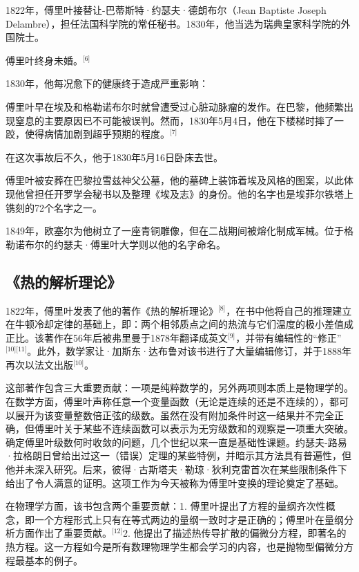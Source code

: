 1822年，傅里叶接替让-巴蒂斯特·约瑟夫·德朗布尔（Jean Baptiste Joseph Delambre），担任法国科学院的常任秘书。1830年，他当选为瑞典皇家科学院的外国院士。

傅里叶终身未婚。\(^\text{[6]}\)

1830年，他每况愈下的健康终于造成严重影响：

傅里叶早在埃及和格勒诺布尔时就曾遭受过心脏动脉瘤的发作。在巴黎，他频繁出现窒息的主要原因已不可能被误判。然而，1830年5月4日，他在下楼梯时摔了一跤，使得病情加剧到超乎预期的程度。\(^\text{[7]}\)

在这次事故后不久，他于1830年5月16日卧床去世。

傅里叶被安葬在巴黎拉雪兹神父公墓，他的墓碑上装饰着埃及风格的图案，以此体现他曾担任开罗学会秘书以及整理《埃及志》的身份。他的名字也是埃菲尔铁塔上镌刻的72个名字之一。

1849年，欧塞尔为他树立了一座青铜雕像，但在二战期间被熔化制成军械。位于格勒诺布尔的约瑟夫·傅里叶大学则以他的名字命名。
\subsection{《热的解析理论》}
1822年，傅里叶发表了他的著作《热的解析理论》\(^\text{[8]}\)，在书中他将自己的推理建立在牛顿冷却定律的基础上，即：两个相邻质点之间的热流与它们温度的极小差值成正比。该著作在56年后被弗里曼于1878年翻译成英文\(^\text{[9]}\)，并带有编辑性的“修正”\(^\text{[10][11]}\)。此外，数学家让·加斯东·达布鲁对该书进行了大量编辑修订，并于1888年再次以法文出版\(^\text{[10]}\)。

这部著作包含三大重要贡献：一项是纯粹数学的，另外两项则本质上是物理学的。在数学方面，傅里叶声称任意一个变量函数（无论是连续的还是不连续的），都可以展开为该变量整数倍正弦的级数。虽然在没有附加条件时这一结果并不完全正确，但傅里叶关于某些不连续函数可以表示为无穷级数和的观察是一项重大突破。确定傅里叶级数何时收敛的问题，几个世纪以来一直是基础性课题。约瑟夫-路易·拉格朗日曾给出过这一（错误）定理的某些特例，并暗示其方法具有普遍性，但他并未深入研究。后来，彼得·古斯塔夫·勒琼·狄利克雷首次在某些限制条件下给出了令人满意的证明。这项工作为今天被称为傅里叶变换的理论奠定了基础。

在物理学方面，该书包含两个重要贡献：1. 傅里叶提出了方程的量纲齐次性概念，即一个方程形式上只有在等式两边的量纲一致时才是正确的；傅里叶在量纲分析方面作出了重要贡献。\(^\text{[12]}\)2. 他提出了描述热传导扩散的偏微分方程，即著名的热方程。这一方程如今是所有数理物理学生都会学习的内容，也是抛物型偏微分方程最基本的例子。
